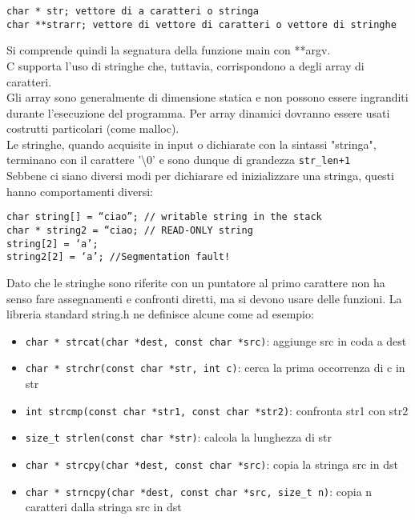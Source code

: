 \begin{flushleft}
\begin{itemize}
\begin{itemize}
\begin{flushleft}
              \texttt{char * str; vettore di a caratteri o stringa}  \\
              \texttt{char **strarr; vettore di vettore di caratteri o vettore di stringhe} \\
           \end{flushleft}
            Si comprende quindi la segnatura della funzione main con **argv. \\
            C supporta l'uso di stringhe che, tuttavia, corrispondono a degli array di caratteri.\\
            Gli array sono generalmente di dimensione statica e non possono essere ingranditi 
            durante l'esecuzione del programma. Per array dinamici dovranno essere usati 
            costrutti particolari (come malloc). \\
            Le stringhe, quando acquisite in input o dichiarate con la sintassi "stringa", 
            terminano con il carattere '\textbackslash 0' e sono dunque di grandezza \texttt{str\_len+1} \\
            Sebbene ci siano diversi modi per dichiarare ed inizializzare una stringa, questi hanno comportamenti diversi:
            \begin{flushleft}
              \texttt{char string[] = “ciao”; // writable string in the stack \\
              char * string2 = “ciao; // READ-ONLY string \\
              string[2] = ‘a’;\\
              string2[2] = ‘a’; //Segmentation fault! \\}
            \end{flushleft}
            Dato che le stringhe sono riferite con un puntatore al primo carattere non ha senso 
            fare assegnamenti e confronti diretti, ma si devono usare delle funzioni. La libreria 
            standard string.h ne definisce alcune come ad esempio:
            \begin{itemize}
              \item \texttt{char * strcat(char *dest, const char *src)}: aggiunge src in coda a dest
              \item \texttt{char * strchr(const char *str, int c)}: cerca la prima occorrenza di c in str
              \item \texttt{int strcmp(const char *str1, const char *str2)}: confronta str1 con str2
              \item \texttt{size\_t\ strlen(const char *str)}: calcola la lunghezza di str
              \item \texttt{char * strcpy(char *dest, const char *src)}: copia la stringa src in dst
              \item \texttt{char * strncpy(char *dest, const char *src, size\_t n)}: copia n caratteri 
                    dalla stringa src in dst
            \end{itemize}
          \end{itemize}
  \end{itemize}
\end{flushleft}